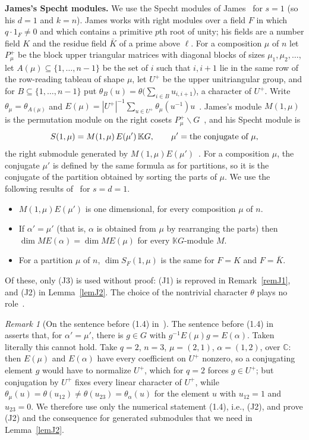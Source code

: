 \documentclass[11pt, letterpaper]{amsart}
\let\amstext\text
\renewcommand{\text}[1]{\amstext{\upshape #1}}%
\theoremstyle{definition}
\theoremstyle{remark}
\newtheorem{remark}{Remark}
\newcommand{\KK}{\mathbb{K}}
\newcommand{\CC}{\mathbb{C}}
\begin{document}
\medskip
\noindent\textbf{James's Specht modules.} We use the Specht modules of James~\cite{Jam86} for $s=1$ (so his $d=1$ and $k=n$). James works with right modules over a field $F$ in which $q\cdot1_F\ne0$ and which contains a primitive $p$th root of unity; his fields are a number field $K$ and the residue field $\bar K$ of a prime above $\ell$. For a composition $\mu$ of $n$ let $P^+_\mu$ be the block upper triangular matrices with diagonal blocks of sizes $\mu_1,\mu_2,\dots$, let $A(\mu)\subseteq\{1,\dots,n-1\}$ be the set of $i$ such that $i,i+1$ lie in the same row of the row-reading tableau of shape $\mu$, let $U^+$ be the upper unitriangular group, and for $B\subseteq\{1,\dots,n-1\}$ put $\theta_B(u)=\theta\bigl(\sum_{i\in B}u_{i,i+1}\bigr)$, a character of $U^+$. Write $\theta_\mu=\theta_{A(\mu)}$ and $E(\mu)=|U^+|^{-1}\sum_{u\in U^+}\theta_\mu(u^{-1})u$~\cite[Def.~1.3, (1.6)]{Jam86}. James's module $M(1,\mu)$ is the permutation module on the right cosets $P^+_\mu\backslash G$~\cite[\S2]{Jam86}, and his Specht module is
\[
S(1,\mu)=M(1,\mu)\,E(\mu')\,\KK G,\qquad \mu'=\text{the conjugate of }\mu,
\]
the right submodule generated by $M(1,\mu)E(\mu')$~\cite[Def.~7.7]{Jam86}. For a composition $\mu$, the conjugate $\mu'$ is defined by the same formula as for partitions, so it is the conjugate of the partition obtained by sorting the parts of $\mu$. We use the following results of~\cite{Jam86} for $s=d=1$.
\begin{itemize}
\item[(J1)] [Thm.~7.1(ii)] $M(1,\mu)E(\mu')$ is one dimensional, for every composition $\mu$ of $n$.
\item[(J2)] [(1.4)] If $\alpha'=\mu'$ (that is, $\alpha$ is obtained from $\mu$ by rearranging the parts) then $\dim ME(\alpha)=\dim ME(\mu)$ for every $\KK G$-module $M$.
\item[(J3)] [Thm.~7.19(i)] For a partition $\mu$ of $n$, $\dim S_F(1,\mu)$ is the same for $F=K$ and $F=\bar K$.
\end{itemize}
Of these, only (J3) is used without proof: (J1) is reproved in Remark~\ref{remJ1}, and (J2) in Lemma~\ref{lemJ2}. The choice of the nontrivial character $\theta$ plays no role~\cite[pp.~239--240, before (1.9)]{Jam86}.

\begin{remark}[On the sentence before (1.4) in~\cite{Jam86}]\label{remJ2}
The sentence before (1.4) in~\cite{Jam86} asserts that, for $\alpha'=\mu'$, there is $g\in G$ with $g^{-1}E(\mu)g=E(\alpha)$. Taken literally this cannot hold. Take $q=2$, $n=3$, $\mu=(2,1)$, $\alpha=(1,2)$, over $\CC$: then $E(\mu)$ and $E(\alpha)$ have every coefficient on $U^+$ nonzero, so a conjugating element $g$ would have to normalize $U^+$, which for $q=2$ forces $g\in U^+$; but conjugation by $U^+$ fixes every linear character of $U^+$, while $\theta_\mu(u)=\theta(u_{12})\neq\theta(u_{23})=\theta_\alpha(u)$ for the element $u$ with $u_{12}=1$ and $u_{23}=0$. We therefore use only the numerical statement (1.4), i.e., (J2), and prove (J2) and the consequence for generated submodules that we need in Lemma~\ref{lemJ2}.
\end{remark}
\end{document}
